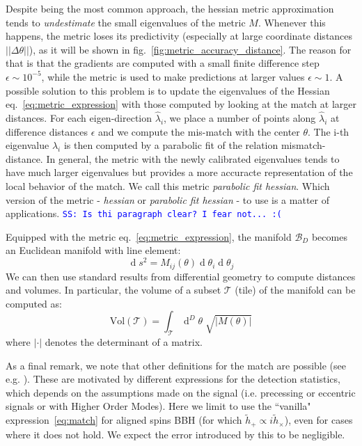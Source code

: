 \documentclass[twocolumn,showpacs,preprintnumbers,nofootinbib,prd,
superscriptaddress,10pt]{revtex4-2}
\renewcommand{\d}[1]{\ensuremath{\operatorname{d}\!{#1}}}
\newcommand{\dvol}[2]{\ensuremath{\operatorname{d}^{#2}\!{#1}}}
\newcommand{\stefano}[1]{{\textcolor{blue}{\texttt{SS: #1}} }}
\begin{document}
Despite being the most common approach, the hessian metric approximation tends to {\it undestimate} the small eigenvalues of the metric $M$. Whenever this happens, the metric loses its predictivity (especially at large coordinate distances $||\Delta\theta||$), as it will be shown in fig.~\ref{fig:metric_accuracy_distance}.
The reason for that is that the gradients are computed with a small finite difference step $\epsilon \sim 10^{-5}$, while the metric is used to make predictions at larger values $\epsilon \sim 1$.
A possible solution to this problem is to update the eigenvalues of the Hessian eq.~\eqref{eq:metric_expression} with those computed by looking at the match at larger distances. For each eigen-direction $\hat{\lambda}_i$, we place a number of points along $\hat{\lambda}_i$ at difference distances $\epsilon$ and we compute the mis-match with the center $\theta$. The i-th eigenvalue $\lambda_i$ is then computed by a parabolic fit of the relation mismatch-distance.
In general, the metric with the newly calibrated eigenvalues tends to have much larger eigenvalues but provides a more accuracte representation of the local behavior of the match. We call this metric {\it parabolic fit hessian}.
Which version of the metric - {\it hessian} or {\it parabolic fit hessian} - to use is a matter of applications.
\stefano{Is thi paragraph clear? I fear not... :(}

Equipped with the metric eq.~\eqref{eq:metric_expression}, the manifold $\mathcal{B}_D$ becomes an Euclidean manifold with line element:
\begin{equation}\label{eq:line_element}
	\d{s^2} = M_{ij}(\theta) \d{\theta_i} \d{\theta_j}
\end{equation}
We can then use standard results from differential geometry to compute distances and volumes. In particular, the volume of a subset $\mathcal{T}$ (tile) of the manifold can be computed as:
\begin{equation}\label{eq:volume_tile}
	\text{Vol}(\mathcal{T}) = \int_\mathcal{T} \dvol{\theta}{D} \; \sqrt{|M(\theta)|}
\end{equation}
where $|\cdot|$ denotes the determinant of a matrix.

As a final remark, we note that other definitions for the match are possible (see e.g. \cite{sky_maxed,symphony}). These are motivated by different expressions for the detection statistics, which depends on the assumptions made on the signal (i.e. precessing or eccentric signals or with Higher Order Modes). Here we limit to use the ``vanilla" expression~\eqref{eq:match} for aligned spins BBH (for which $\tilde{h}_+ \propto i \tilde{h}_\times$), even for cases where it does not hold. We expect the error introduced by this to be negligible.
\end{document}
